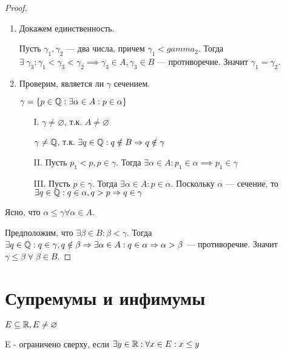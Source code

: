 \begin{proof}
    \begin{enumerate}
        \item Докажем единственность. 
        
        Пусть $\gamma_1, \gamma_2$ --- два числа, причем $\gamma_1 < gamma_2$. Тогда $\exists \; \gamma_3: \gamma_1 < \gamma_3 < \gamma_2 \implies \gamma_3 \in A, \gamma_3 \in B$ --- противоречие. Значит $\gamma_1 = \gamma_2$.

        \item Проверим, является ли $\gamma$ сечением.
        
        $\gamma = \{p \in \mathbb{Q}: \exists \alpha \in A: p \in \alpha\}$

        \begin{enumerate}
            \item[I.] $\gamma \neq \varnothing$, т.к. $A \neq \varnothing$
            
            $\gamma \neq \mathbb{Q}$, т.к. $\exists q \in \mathbb{Q}: q \notin B \Rightarrow q \notin \gamma$
            \item[II.] Пусть $p_1 < p, p \in \gamma$. Тогда $\exists \alpha \in A: p_1 \in \alpha \implies p_1 \in \gamma$
            \item[III.] Пусть $p \in \gamma$. Тогда $\exists \alpha \in A: p \in \alpha$. Поскольку $\alpha$ --- сечение, то $\exists q \in \mathbb{Q}: q \in \alpha, q > p \Rightarrow q \in \gamma$
        \end{enumerate}
    \end{enumerate}

    Ясно, что $\alpha \leq \gamma \forall \alpha \in A$.

    Предположим, что $\exists \beta \in B: \beta < \gamma$. Тогда $\exists q \in \mathbb{Q}: q \in \gamma, q \notin \beta \Rightarrow \exists \alpha \in A: q \in \alpha \Rightarrow \alpha > \beta$ --- противоречие. Значит $\gamma \leq \beta \;  \forall \; \beta \in B$.
\end{proof}

\section{Супремумы и инфимумы}

\begin{definition}
    $E \subseteq \mathbb{R}, E \neq \varnothing$

    E - ограничено сверху, если $\exists y \in \mathbb{R}: \forall x \in E: x \leq y$
\end{definition}

